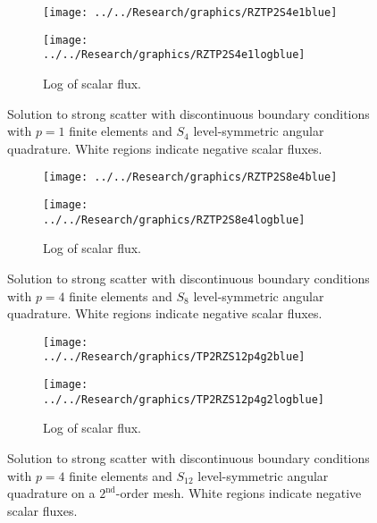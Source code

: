 \documentclass[12pt]{article}
\begin{document}
\begin{figure}[!htb]
\centering
\begin{subfigure}{0.45\textwidth}
\centering
\texttt{[image: ../../Research/graphics/RZTP2S4e1blue]}
\label{fig:RZTP2S8e4blue}
\end{subfigure}%
\hspace{0.05\textwidth}
\begin{subfigure}{0.45\textwidth}
\centering
\texttt{[image: ../../Research/graphics/RZTP2S4e1logblue]}
\caption{Log of scalar flux.}
\label{fig:RZTP2S8e4logblue}
\end{subfigure}
\caption{Solution to strong scatter with discontinuous boundary conditions with $p=1$ finite elements and $S_4$ level-symmetric angular quadrature. White regions indicate negative scalar fluxes.}
\label{fig:RZTP2S4e1}
\end{figure}

\begin{figure}[!htb]
\centering
\begin{subfigure}{0.45\textwidth}
\centering
\texttt{[image: ../../Research/graphics/RZTP2S8e4blue]}
\label{fig:RZTP2S8e4blue}
\end{subfigure}%
\hspace{0.05\textwidth}
\begin{subfigure}{0.45\textwidth}
\centering
\texttt{[image: ../../Research/graphics/RZTP2S8e4logblue]}
\caption{Log of scalar flux.}
\label{fig:RZTP2S8e4logblue}
\end{subfigure}
\caption{Solution to strong scatter with discontinuous boundary conditions with $p=4$ finite elements and $S_8$ level-symmetric angular quadrature. White regions indicate negative scalar fluxes.}
\label{fig:RZTP2S8e4}
\end{figure}

\begin{figure}[!htb]
\centering
\begin{subfigure}{0.45\textwidth}
\centering
\texttt{[image: ../../Research/graphics/TP2RZS12p4g2blue]}
\label{fig:TP2RZS12p4g2blue}
\end{subfigure}%
\hspace{0.05\textwidth}
\begin{subfigure}{0.45\textwidth}
\centering
\texttt{[image: ../../Research/graphics/TP2RZS12p4g2logblue]}
\caption{Log of scalar flux.}
\label{fig:TP2RZS12p4g2logblue}
\end{subfigure}
\caption{Solution to strong scatter with discontinuous boundary conditions with $p=4$ finite elements and $S_{12}$ level-symmetric angular quadrature on a $2^\text{nd}$-order mesh. White regions indicate negative scalar fluxes.}
\label{fig:TP2RZS12p4g2}
\end{figure}
\end{document}
